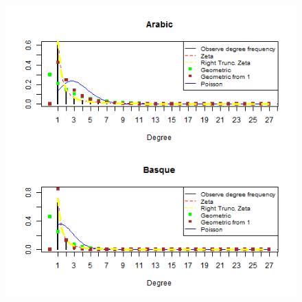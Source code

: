 \documentclass[paper=a4, fontsize=11pt]{scrartcl} %
\theoremstyle{plain}
\begin{document}
\begin{figure}[htbp] %
   \centering
   \includegraphics[width=15cm,height=27cm]{Altman_1} %
\end{figure}
\end{document}
